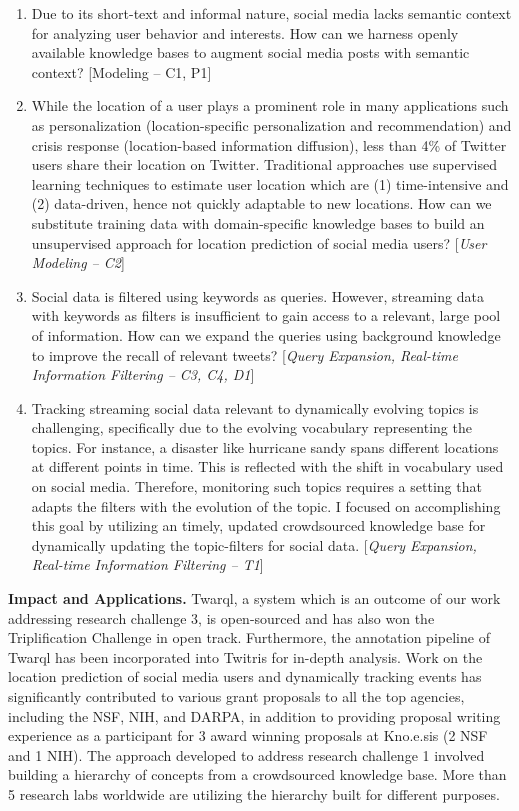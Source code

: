 \documentclass[12pt]{letter} %
\begin{document}
\begin{enumerate}
\item Due to its short-text and informal nature, social media lacks semantic context for analyzing user behavior and interests. How can we harness openly available knowledge bases to augment social media posts with semantic context? [Modeling -- C1, P1]
\item While the location of a user plays a prominent role in many applications such as personalization (location-specific personalization and recommendation) and crisis response (location-based information diffusion),  less than 4\% of Twitter users share their location on Twitter. Traditional approaches use supervised learning techniques to estimate user location which are (1) time-intensive and (2) data-driven, hence not quickly adaptable to new locations. How can we substitute training data with domain-specific knowledge bases to build an unsupervised approach for location prediction of social media users? [\textit{User Modeling -- C2}]
\item Social data is filtered using keywords as queries. However, streaming data with  keywords as filters is insufficient to gain access to a relevant, large pool of information. How can we expand the queries using background knowledge to improve the recall of relevant tweets?   [\textit{Query Expansion, Real-time Information Filtering -- C3, C4, D1}]
\item Tracking streaming social data relevant to dynamically evolving topics is challenging, specifically due to the evolving vocabulary representing the topics. For instance, a disaster like hurricane sandy spans different locations at different points in time. This is reflected with the shift in vocabulary used on social media. Therefore, monitoring such topics requires a setting that adapts the filters with the evolution of the topic. I  focused on accomplishing this goal by utilizing an timely, updated crowdsourced knowledge base for dynamically updating the topic-filters for social data. [\textit{Query Expansion, Real-time Information Filtering -- T1}]
\end{enumerate}


\vspace{1.0em} 
\textbf{Impact and Applications.}
\vspace{0.3em}
Twarql, a system which is an outcome of our work addressing research challenge 3, is open-sourced and has also won the Triplification Challenge in open track. Furthermore, the annotation pipeline of Twarql has been incorporated into Twitris for in-depth analysis. Work on the location prediction of social media users and dynamically tracking events has significantly contributed to various grant proposals to all the top agencies, including the NSF, NIH, and DARPA, in addition to providing proposal writing experience as a participant for 3 award winning proposals at Kno.e.sis (2 NSF and 1 NIH). The approach developed to address research challenge 1 involved building a hierarchy of concepts from a crowdsourced knowledge base. More than 5 research labs worldwide are utilizing the hierarchy built for different purposes.
\end{document}
